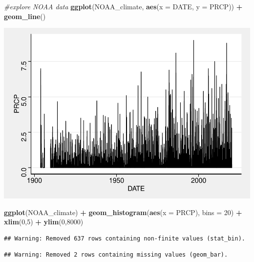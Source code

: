 \documentclass[]{article}
\newenvironment{Shaded}{\begin{snugshade}}{\end{snugshade}}
\newcommand{\CommentTok}[1]{\textcolor[rgb]{0.56,0.35,0.01}{\textit{#1}}}
\newcommand{\DataTypeTok}[1]{\textcolor[rgb]{0.13,0.29,0.53}{#1}}
\newcommand{\DecValTok}[1]{\textcolor[rgb]{0.00,0.00,0.81}{#1}}
\newcommand{\KeywordTok}[1]{\textcolor[rgb]{0.13,0.29,0.53}{\textbf{#1}}}
\newcommand{\NormalTok}[1]{#1}
\newcommand{\OperatorTok}[1]{\textcolor[rgb]{0.81,0.36,0.00}{\textbf{#1}}}
\newcommand{\StringTok}[1]{\textcolor[rgb]{0.31,0.60,0.02}{#1}}
\begin{document}
\begin{Shaded}
\begin{Highlighting}[]
\CommentTok{#explore NOAA data}
\KeywordTok{ggplot}\NormalTok{(NOAA_climate, }\KeywordTok{aes}\NormalTok{(}\DataTypeTok{x =}\NormalTok{ DATE, }\DataTypeTok{y =}\NormalTok{ PRCP)) }\OperatorTok{+}
\StringTok{  }\KeywordTok{geom_line}\NormalTok{()}
\end{Highlighting}
\end{Shaded}

\includegraphics{data_exploration_files/figure-latex/unnamed-chunk-5-1.pdf}

\begin{Shaded}
\begin{Highlighting}[]
\KeywordTok{ggplot}\NormalTok{(NOAA_climate) }\OperatorTok{+}
\StringTok{  }\KeywordTok{geom_histogram}\NormalTok{(}\KeywordTok{aes}\NormalTok{(}\DataTypeTok{x =}\NormalTok{ PRCP), }\DataTypeTok{bins =} \DecValTok{20}\NormalTok{) }\OperatorTok{+}
\StringTok{  }\KeywordTok{xlim}\NormalTok{(}\DecValTok{0}\NormalTok{,}\DecValTok{5}\NormalTok{) }\OperatorTok{+}
\StringTok{  }\KeywordTok{ylim}\NormalTok{(}\DecValTok{0}\NormalTok{,}\DecValTok{8000}\NormalTok{)}
\end{Highlighting}
\end{Shaded}

\begin{verbatim}
## Warning: Removed 637 rows containing non-finite values (stat_bin).
\end{verbatim}

\begin{verbatim}
## Warning: Removed 2 rows containing missing values (geom_bar).
\end{verbatim}
\end{document}
